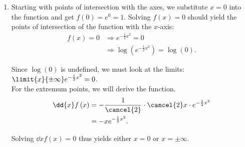 \begin{enumerate}
{\begin{answer}
\begin{enumerate}
								The only thing remaining is to determine what are the limits of the function at $\pm\infty$. Since $x^{3}$ is the term with the highest power of $x$, $\limit{x}{-\infty}f\left( x \right)=-\infty$ and $\limit{x}{\infty}f\left( x \right)=\infty$. Thus, the complete function looks as follows:
								\begin{figure}[H]
									\centering
								\end{figure}

							\item
								Starting with points of intersection with the axes, we substitute $x=0$ into the function and get $f\left( 0 \right)=e^{0}=1$. Solving $f\left( x \right)=0$ should yield the points of intersection of the function with the $x$-axis:
								\begin{align*}
									f\left( x \right)=0 &\Rightarrow e^{-\frac{1}{2}x^{2}}=0\\
									&\Rightarrow \log\left( e^{-\frac{1}{2}x^{2}} \right) = \log\left( 0 \right).
								\end{align*}

								Since $\log\left( 0 \right)$ is undefined, we must look at the limits: $\limit{x}{\pm\infty}e^{-\frac{1}{2}x^{2}}=0$.\\

								For the extremum points, we will derive the function.
								\begin{align*}
									\dd{x}f\left( x \right) &= -\frac{1}{\cancel{2}}\cdot\cancel{2}x\cdot e^{-\frac{1}{2}x^{2}}\\
									&= -xe^{-\frac{1}{2}x^{2}}.
								\end{align*}

								Solving $\dd{x}f\left( x \right)=0$ thus yields either $x=0$ or $x=\pm\infty$.\\


\end{enumerate}
\end{answer}}
\end{enumerate}
